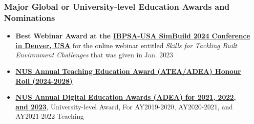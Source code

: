 \documentclass[10pt,a4paper]{article}
\begin{document}
\begin{small}
\begin{itemize}
\end{itemize}

\subsubsection*{Major Global or University-level Education Awards and Nominations}

\begin{itemize}

  \item \textbf{Best Webinar Award at the \href{https://www.ibpsa.us/simbuild-2024/}{IBPSA-USA SimBuild 2024 Conference in Denver, USA}} for the online webinar entitled \emph{Skills for Tackling Built Environment Challenges} that was given in Jan. 2023%

  \item \textbf{\href{https://ctlt.nus.edu.sg/teaching-awards/award-winners/}{NUS Annual Teaching Education Award (ATEA/ADEA) Honour Roll (2024-2028)}}%

  \item \textbf{\href{https://ctlt.nus.edu.sg/teaching-awards/award-winners/}{NUS Annual Digital Education Awards (ADEA) for 2021, 2022, and 2023}}, University-level Award, For AY2019-2020, AY2020-2021, and AY2021-2022 Teaching%




\end{itemize}
\end{small}
\end{document}
